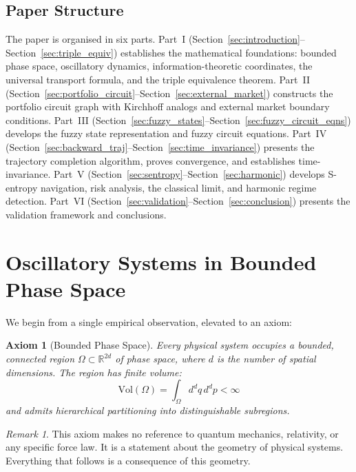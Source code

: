 \documentclass[twocolumn,10pt]{article}
\newtheorem{axiom}{Axiom}
\theoremstyle{remark}
\newtheorem{remark}[theorem]{Remark}
\newcommand{\secref}[1]{Section~\ref{#1}}
\begin{document}
\subsection{Paper Structure}

The paper is organised in six parts.  Part~I (\secref{sec:introduction}--\secref{sec:triple_equiv}) establishes the mathematical foundations: bounded phase space, oscillatory dynamics, information-theoretic coordinates, the universal transport formula, and the triple equivalence theorem.  Part~II (\secref{sec:portfolio_circuit}--\secref{sec:external_market}) constructs the portfolio circuit graph with Kirchhoff analogs and external market boundary conditions.  Part~III (\secref{sec:fuzzy_states}--\secref{sec:fuzzy_circuit_eqns}) develops the fuzzy state representation and fuzzy circuit equations.  Part~IV (\secref{sec:backward_traj}--\secref{sec:time_invariance}) presents the trajectory completion algorithm, proves convergence, and establishes time-invariance.  Part~V (\secref{sec:sentropy}--\secref{sec:harmonic}) develops S-entropy navigation, risk analysis, the classical limit, and harmonic regime detection.  Part~VI (\secref{sec:validation}--\secref{sec:conclusion}) presents the validation framework and conclusions.


\section{Oscillatory Systems in Bounded Phase Space}
\label{sec:oscillatory}

We begin from a single empirical observation, elevated to an axiom:

\begin{axiom}[Bounded Phase Space]
\label{ax:bounded}
Every physical system occupies a bounded, connected region $\Omega \subset \mathbb{R}^{2d}$ of phase space, where $d$ is the number of spatial dimensions.  The region has finite volume:
\begin{equation}
    \mathrm{Vol}(\Omega) = \int_\Omega d^d q \, d^d p < \infty
    \label{eq:bounded_vol}
\end{equation}
and admits hierarchical partitioning into distinguishable subregions.
\end{axiom}

\begin{remark}
This axiom makes no reference to quantum mechanics, relativity, or any specific force law.  It is a statement about the geometry of physical systems.  Everything that follows is a consequence of this geometry.
\end{remark}
\end{document}
